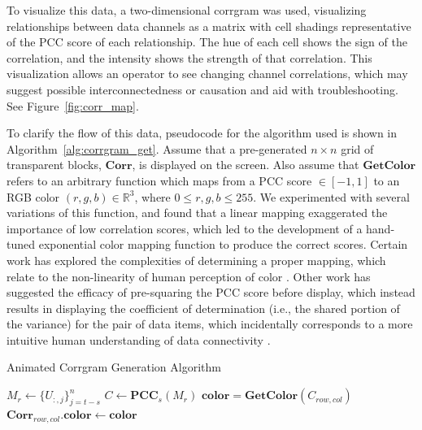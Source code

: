 To visualize this data, a two-dimensional corrgram was used, visualizing relationships between data channels as a matrix with cell shadings representative of the PCC score of each relationship. The hue of each cell shows the sign of the correlation, and the intensity shows the strength of that correlation. This visualization allows an operator to see changing channel correlations, which may suggest possible interconnectedness or causation and aid with troubleshooting. See Figure~\ref{fig:corr_map}.

To clarify the flow of this data, pseudocode for the algorithm used is shown in Algorithm~\ref{alg:corrgram_get}. Assume that a pre-generated $n \times n$ grid of transparent blocks, $\textbf{Corr}$, is displayed on the screen. Also assume that $\textbf{GetColor}$ refers to an arbitrary function which maps from a PCC score $\in [-1,1]$ to an RGB color $(r, g, b) \in \mathbb{R}^{3}$, where $0 \leq r, g, b \leq 255$. We experimented with several variations of this function, and found that a linear mapping exaggerated the importance of low correlation scores, which led to the development of a hand-tuned exponential color mapping function to produce the correct scores. Certain work has explored the complexities of determining a proper mapping, which relate to the non-linearity of human perception of color \cite{friendly2002corrgrams}. Other work has suggested the efficacy of pre-squaring the PCC score before display, which instead results in displaying the coefficient of determination (i.e., the shared portion of the variance) for the pair of data items, which incidentally corresponds to a more intuitive human understanding of data connectivity \cite{rummelcorrelation}.

\begin{algorithm}
    \caption{Animated Corrgram Generation Algorithm}\label{alg:corrgram_get}
    \begin{algorithmic}[1]
        \State $M_{r} \gets \{U_{:,j}\}_{j=t-s}^{n}$ 
        \State $C\gets \textbf{PCC}_{s}(M_{r})$ 
                \State $\textbf{color} = \textbf{GetColor}(C_{row, col})$ 
                \State $\textbf{Corr}_{row, col}\textbf{.color} \gets \textbf{color}$ 
            \EndFor
        \EndFor
        \EndProcedure {}
    \end{algorithmic}
\end{algorithm}

